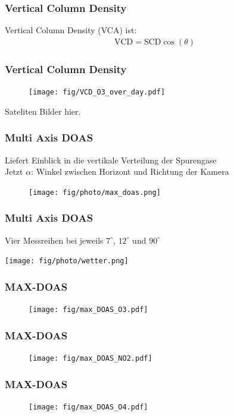\documentclass{beamer}
\begin{document}
\begin{frame}
    \frametitle{Vertical Column Density }
    Vertical Column Density (VCA) ist:
    \begin{align}
        \text{VCD} = \text{SCD} \cos (\theta)
    \end{align}
\end{frame} 

\begin{frame}
    \frametitle{Vertical Column Density }
    \begin{figure}
    \texttt{[image: fig/VCD\_O3\_over\_day.pdf]}
    \end{figure}
\end{frame}

\begin{frame}
    Sateliten Bilder hier.
\end{frame}

\begin{frame}
    \frametitle{Multi Axis DOAS}
    Liefert Einblick in die vertikale Verteilung der Spurengase \\
    Jetzt $\alpha$: Winkel zwischen Horizont und Richtung der Kamera
    \begin{figure}
        \texttt{[image: fig/photo/max\_doas.png]}
    \end{figure}
\end{frame}

\begin{frame}
    \frametitle{Multi Axis DOAS}
    Vier Messreihen bei jeweils $7^\circ$, $12^\circ$ und $90^\circ$ \\
    \begin{center}
    \texttt{[image: fig/photo/wetter.png]}
    \end{center}
\end{frame}

\begin{frame}
    \frametitle{MAX-DOAS }
    \begin{figure}
    \texttt{[image: fig/max\_DOAS\_O3.pdf]}
    \end{figure}
\end{frame}

\begin{frame}
    \frametitle{MAX-DOAS }
    \begin{figure}
    \texttt{[image: fig/max\_DOAS\_NO2.pdf]}
    \end{figure}
\end{frame}


\begin{frame}
    \frametitle{MAX-DOAS }
    \begin{figure}
    \texttt{[image: fig/max\_DOAS\_O4.pdf]}
    \end{figure}
\end{frame}
\end{document}
